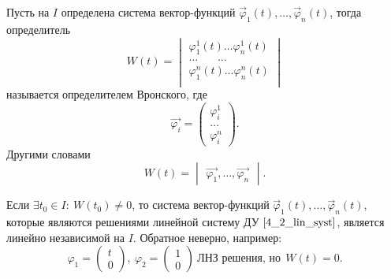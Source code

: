 \begin{definition}
    Пусть на $I$ определена система вектор-функций $\overrightarrow \varphi_1(t), \dots, \overrightarrow \varphi_n(t)$, тогда определитель
    \begin{equation}
        W(t) = 
        \begin{vmatrix}
            \varphi^1_1(t) \dots \varphi^1_n(t) \\
            \dots ~~~~~~~~ \dots \\
            \varphi^n_1(t) \dots \varphi^n_n(t) \\
        \end{vmatrix}
    \end{equation}
    называется определителем Вронского, где
    \begin{equation}
        \overrightarrow{\varphi_i} = 
        \begin{pmatrix}
            \varphi_i^1 \\
            \dots \\
            \varphi_i^n
        \end{pmatrix}.
    \end{equation}
    Другими словами
    \begin{equation}
    W(t) = 
    \begin{vmatrix}
    \overrightarrow{\varphi_1}, \dots, \overrightarrow{\varphi_n}
    \end{vmatrix}.
    \end{equation}
\end{definition}

\begin{theorem}
    Если $\exists t_0 \in I : ~ W(t_0) \neq 0$, то система вектор-функций $\overrightarrow \varphi_1(t), \dots, \overrightarrow \varphi_n(t)$, которые являются решениями линейной систему ДУ $\eqref{4_2_lin_syst}$, является линейно независимой на $I$. Обратное неверно,
    например:
    \begin{equation}
        \varphi_1 = 
        \begin{pmatrix}
            t \\
            0
        \end{pmatrix}, ~
        \varphi_2 = 
        \begin{pmatrix}
            1 \\
            0
        \end{pmatrix} ~ \text{ЛНЗ решения, но} ~~ W(t) = 0.
    \end{equation}
    \label{4_2_wronskian_theorem}
\end{theorem}

